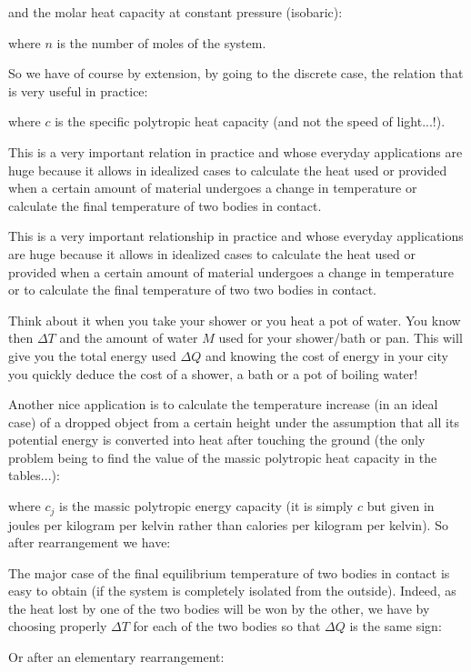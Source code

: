 	and the molar heat capacity at constant pressure (isobaric):
	
	where $n$ is the number of moles of the system.

	So we have of course by extension, by going to the discrete case, the relation that is very useful in practice:
	
	where $c$ is the specific polytropic heat capacity (and not the speed of light...!).

	This is a very important relation in practice and whose everyday applications are huge because it allows in idealized cases to calculate the heat used or provided when a certain amount of material undergoes a change in temperature or calculate the final temperature of two bodies in contact.
	
	This is a very important relationship in practice and whose everyday applications are huge because it allows in idealized cases to calculate the heat used or provided when a certain amount of material undergoes a change in temperature or to calculate the final temperature of two two bodies in contact.

	Think about it when you take your shower or you heat a pot of water. You know then $\Delta T$ and the amount of water $M$ used for your shower/bath or pan. This will give you the total energy used $\Delta Q$ and knowing the cost of energy in your city you quickly deduce the cost of a shower, a bath or a pot of boiling water!

	Another nice application is to calculate the temperature increase (in an ideal case) of a dropped object from a certain height under the assumption that all its potential energy is converted into heat after touching the ground (the only problem being to find the value of the massic polytropic heat capacity in the tables...):
	
	where $c_j$ is the massic polytropic energy capacity (it is simply $c$ but given in joules per kilogram per kelvin rather than calories per kilogram per kelvin). So after rearrangement we have:
	
	The major case of the final equilibrium temperature of two bodies in contact is easy to obtain (if the system is completely isolated from the outside). Indeed, as the heat lost by one of the two bodies will be won by the other, we have by choosing properly $\Delta T$ for each of the two bodies so that $\Delta Q$ is the same sign:
	
	Or after an elementary rearrangement:
	
